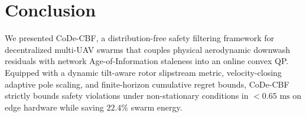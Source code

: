 \documentclass[lettersize,journal]{IEEEtran}
\begin{document}
\section{Conclusion}
We presented CoDe-CBF, a distribution-free safety filtering framework for decentralized multi-UAV swarms that couples physical aerodynamic downwash residuals with network Age-of-Information staleness into an online convex QP. Equipped with a dynamic tilt-aware rotor slipstream metric, velocity-closing adaptive pole scaling, and finite-horizon cumulative regret bounds, CoDe-CBF strictly bounds safety violations under non-stationary conditions in $<0.65\text{ ms}$ on edge hardware while saving $22.4\%$ swarm energy.



\end{document}
